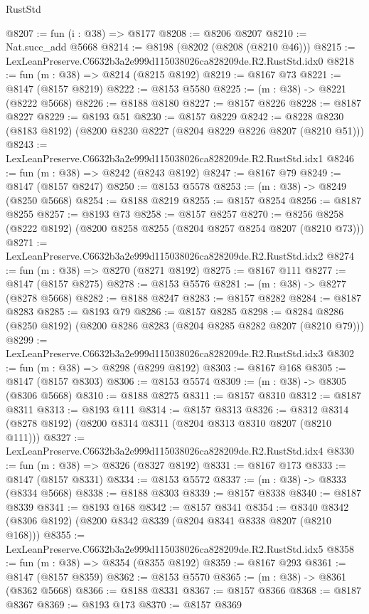 \begin{lexlean}{RustStd}
\begin{coremodule}
@8207 := fun (i : @38) => @8177
@8208 := @8206 @8207
@8210 := Nat.succ_add @5668
@8214 := @8198 (@8202 (@8208 (@8210 @46)))
@8215 := LexLeanPreserve.C6632b3a2e999d115038026ca828209de.R2.RustStd.idx0
@8218 := fun (m : @38) => @8214 (@8215 @8192)
@8219 := @8167 @73
@8221 := @8147 (@8157 @8219)
@8222 := @8153 @5580
@8225 := (m : @38) -> @8221 (@8222 @5668)
@8226 := @8188 @8180
@8227 := @8157 @8226
@8228 := @8187 @8227
@8229 := @8193 @51
@8230 := @8157 @8229
@8242 := @8228 @8230 (@8183 @8192) (@8200 @8230 @8227 (@8204 @8229 @8226 @8207 (@8210 @51)))
@8243 := LexLeanPreserve.C6632b3a2e999d115038026ca828209de.R2.RustStd.idx1
@8246 := fun (m : @38) => @8242 (@8243 @8192)
@8247 := @8167 @79
@8249 := @8147 (@8157 @8247)
@8250 := @8153 @5578
@8253 := (m : @38) -> @8249 (@8250 @5668)
@8254 := @8188 @8219
@8255 := @8157 @8254
@8256 := @8187 @8255
@8257 := @8193 @73
@8258 := @8157 @8257
@8270 := @8256 @8258 (@8222 @8192) (@8200 @8258 @8255 (@8204 @8257 @8254 @8207 (@8210 @73)))
@8271 := LexLeanPreserve.C6632b3a2e999d115038026ca828209de.R2.RustStd.idx2
@8274 := fun (m : @38) => @8270 (@8271 @8192)
@8275 := @8167 @111
@8277 := @8147 (@8157 @8275)
@8278 := @8153 @5576
@8281 := (m : @38) -> @8277 (@8278 @5668)
@8282 := @8188 @8247
@8283 := @8157 @8282
@8284 := @8187 @8283
@8285 := @8193 @79
@8286 := @8157 @8285
@8298 := @8284 @8286 (@8250 @8192) (@8200 @8286 @8283 (@8204 @8285 @8282 @8207 (@8210 @79)))
@8299 := LexLeanPreserve.C6632b3a2e999d115038026ca828209de.R2.RustStd.idx3
@8302 := fun (m : @38) => @8298 (@8299 @8192)
@8303 := @8167 @168
@8305 := @8147 (@8157 @8303)
@8306 := @8153 @5574
@8309 := (m : @38) -> @8305 (@8306 @5668)
@8310 := @8188 @8275
@8311 := @8157 @8310
@8312 := @8187 @8311
@8313 := @8193 @111
@8314 := @8157 @8313
@8326 := @8312 @8314 (@8278 @8192) (@8200 @8314 @8311 (@8204 @8313 @8310 @8207 (@8210 @111)))
@8327 := LexLeanPreserve.C6632b3a2e999d115038026ca828209de.R2.RustStd.idx4
@8330 := fun (m : @38) => @8326 (@8327 @8192)
@8331 := @8167 @173
@8333 := @8147 (@8157 @8331)
@8334 := @8153 @5572
@8337 := (m : @38) -> @8333 (@8334 @5668)
@8338 := @8188 @8303
@8339 := @8157 @8338
@8340 := @8187 @8339
@8341 := @8193 @168
@8342 := @8157 @8341
@8354 := @8340 @8342 (@8306 @8192) (@8200 @8342 @8339 (@8204 @8341 @8338 @8207 (@8210 @168)))
@8355 := LexLeanPreserve.C6632b3a2e999d115038026ca828209de.R2.RustStd.idx5
@8358 := fun (m : @38) => @8354 (@8355 @8192)
@8359 := @8167 @293
@8361 := @8147 (@8157 @8359)
@8362 := @8153 @5570
@8365 := (m : @38) -> @8361 (@8362 @5668)
@8366 := @8188 @8331
@8367 := @8157 @8366
@8368 := @8187 @8367
@8369 := @8193 @173
@8370 := @8157 @8369

\end{coremodule}
\end{lexlean}
